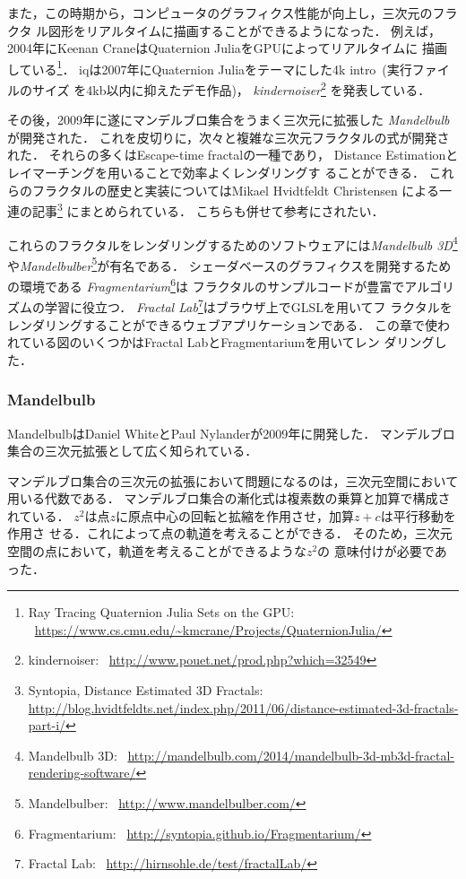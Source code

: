 また，この時期から，コンピュータのグラフィクス性能が向上し，三次元のフラクタ
ル図形をリアルタイムに描画することができるようになった．
例えば，2004年にKeenan CraneはQuaternion JuliaをGPUによってリアルタイムに
描画している\footnote{Ray Tracing Quaternion Julia Sets on
the GPU:
~\url{https://www.cs.cmu.edu/~kmcrane/Projects/QuaternionJulia/}}．
iqは2007年にQuaternion Juliaをテーマにした4k intro~(実行ファイルのサイズ
を4kb以内に抑えたデモ作品)，
\textit{kindernoiser}\footnote{kindernoiser:
~\url{http://www.pouet.net/prod.php?which=32549}}
を発表している．

その後，2009年に遂にマンデルブロ集合をうまく三次元に拡張した
\textit{Mandelbulb}が開発された．
これを皮切りに，次々と複雑な三次元フラクタルの式が開発された．
それらの多くはEscape-time fractalの一種であり，
Distance Estimationとレイマーチングを用いることで効率よくレンダリングす
ることができる．
これらのフラクタルの歴史と実装についてはMikael Hvidtfeldt Christensen
による一連の記事\footnote{Syntopia, Distance Estimated 3D Fractals:\\
\url{http://blog.hvidtfeldts.net/index.php/2011/06/distance-estimated-3d-fractals-part-i/}}
にまとめられている．
こちらも併せて参考にされたい．

これらのフラクタルをレンダリングするためのソフトウェアには\textit{Mandelbulb
3D}\footnote{Mandelbulb 3D:
~\url{http://mandelbulb.com/2014/mandelbulb-3d-mb3d-fractal-rendering-software/}}
や\textit{Mandelbulber}\footnote{Mandelbulber:
~\url{http://www.mandelbulber.com/}}が有名である．
シェーダベースのグラフィクスを開発するための環境である
\textit{Fragmentarium}\footnote{Fragmentarium:
~\url{http://syntopia.github.io/Fragmentarium/}}は
フラクタルのサンプルコードが豊富でアルゴリズムの学習に役立つ．
\textit{Fractal Lab}\footnote{Fractal Lab:
~\url{http://hirnsohle.de/test/fractalLab/}}はブラウザ上でGLSLを用いてフ
ラクタルをレンダリングすることができるウェブアプリケーションである．
この章で使われている図のいくつかはFractal LabとFragmentariumを用いてレン
ダリングした．

\subsubsection{Mandelbulb}

MandelbulbはDaniel WhiteとPaul Nylanderが2009年に開発した．
マンデルブロ集合の三次元拡張として広く知られている．

マンデルブロ集合の三次元の拡張において問題になるのは，三次元空間において
用いる代数である．
マンデルブロ集合の漸化式は複素数の乗算と加算で構成されている．
$z^2$は点$z$に原点中心の回転と拡縮を作用させ，加算$z + c$は平行移動を作用さ
せる．これによって点の軌道を考えることができる．
そのため，三次元空間の点において，軌道を考えることができるような$z^2$の
意味付けが必要であった．


